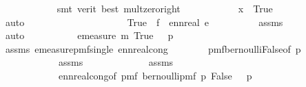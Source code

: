 \begin{isabellebody}
\ \ \ \ \ \ \ \ \ \ \isamarkupfalse%
\ {\isacharparenleft}{\kern0pt}smt\ {\isacharparenleft}{\kern0pt}verit{\isacharcomma}{\kern0pt}\ best{\isacharparenright}{\kern0pt}\ mult{\isacharunderscore}{\kern0pt}zero{\isacharunderscore}{\kern0pt}right{\isacharparenright}{\kern0pt}\isanewline
\ \ \ \ \ \ \ \ \isamarkupfalse%
\ \isamarkupfalse%
\ {\isachardoublequoteopen}x\ {\isasymin}\ {\isacharbraceleft}{\kern0pt}True{\isacharbraceright}{\kern0pt}{\isachardoublequoteclose}\isanewline
\ \ \ \ \ \ \ \ \ \ \isamarkupfalse%
\ auto\isanewline
\ \ \ \ \ \ \isamarkupfalse%
\isanewline
\ \ \ \ \isamarkupfalse%
\ \isanewline
\ \ \ \ \ \ \isamarkupfalse%
\ {\isachardoublequoteopen}{\isacharbraceleft}{\kern0pt}True{\isacharbraceright}{\kern0pt}\ {\isasymsubseteq}\ f\ {\isacharminus}{\kern0pt}{\isacharbackquote}{\kern0pt}\ {\isacharbraceleft}{\kern0pt}ennreal\ e{\isacharbraceright}{\kern0pt}{\isachardoublequoteclose}\isanewline
\ \ \ \ \ \ \ \ \isamarkupfalse%
\ assms{\isacharparenleft}{\kern0pt}{}{\isacharparenright}{\kern0pt}\isanewline
\ \ \ \ \ \ \ \ \isamarkupfalse%
\ auto\isanewline
\ \ \ \ \isamarkupfalse%
\isanewline
\ \ \ \ \isamarkupfalse%
\ {\isachardoublequoteopen}emeasure\ m\ {\isacharparenleft}{\kern0pt}{\isacharbraceleft}{\kern0pt}True{\isacharbraceright}{\kern0pt}{\isacharparenright}{\kern0pt}\ {\isacharequal}{\kern0pt}\ \ p{}{\isachardoublequoteclose}\isanewline
\ \ \ \ \ \ \isamarkupfalse%
\ assms{\isacharparenleft}{\kern0pt}{}{\isacharparenright}{\kern0pt}\ emeasure{\isacharunderscore}{\kern0pt}pmf{\isacharunderscore}{\kern0pt}single\ ennreal{\isacharunderscore}{\kern0pt}cong\isanewline
\ \ \ \ \ \ \isamarkupfalse%
\ pmf{\isacharunderscore}{\kern0pt}bernoulli{\isacharunderscore}{\kern0pt}False{\isacharbrackleft}{\kern0pt}of\ p{}{\isacharbrackright}{\kern0pt}\isanewline
\ \ \ \ \ \ \ \ \ \ \ \ assms{\isacharparenleft}{\kern0pt}{}{\isacharparenright}{\kern0pt}\ \isanewline
\ \ \ \ \ \ \ \ \ \ \ \ assms{\isacharparenleft}{\kern0pt}{}{\isacharparenright}{\kern0pt}\ \isanewline
\ \ \ \ \ \ \ \ \ \ \ \ ennreal{\isacharunderscore}{\kern0pt}cong{\isacharbrackleft}{\kern0pt}of\ {\isachardoublequoteopen}pmf\ {\isacharparenleft}{\kern0pt}bernoulli{\isacharunderscore}{\kern0pt}pmf\ p{}{\isacharparenright}{\kern0pt}\ False{\isachardoublequoteclose}\ {\isachardoublequoteopen}{}\ {\isacharminus}{\kern0pt}\ p{}{\isachardoublequoteclose}{\isacharbrackright}{\kern0pt}\isanewline

\end{isabellebody}
